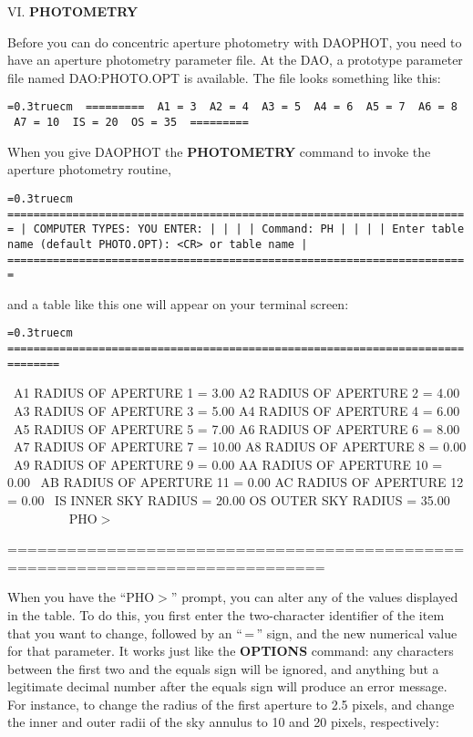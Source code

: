 \vfill
\eject
\noindent VI.  {\bf PHOTOMETRY}

Before you can do concentric aperture photometry with DAOPHOT, you
need to have an aperture photometry parameter file.  At the DAO, a
prototype parameter file named DAO:PHOTO.OPT is available.  The
file looks something like this:

\bigskip
{\obeylines\obeyspaces\frenchspacing\tt\baselineskip=0.3truecm
\     =========
\      A1 = 3
\      A2 = 4
\      A3 = 5
\      A4 = 6
\      A5 = 7
\      A6 = 8
\      A7 = 10
\      IS = 20
\      OS = 35
\     =========
}
\bigskip

\noindent When you give DAOPHOT the {\bf PHOTOMETRY} command to invoke the
aperture photometry routine,

\bigskip
{\noindent\obeylines\obeyspaces\frenchspacing\tt\baselineskip=0.3truecm
=======================================================================
| COMPUTER TYPES:                                  YOU ENTER:         |
|                                                                     |
| Command:                                         PH                 |
|                                                                     |
|       Enter table name (default PHOTO.OPT):      <CR> or table name |
=======================================================================
}
\bigskip

\noindent and a table like this one will appear on your terminal screen:

\bigskip
{\noindent\obeylines\obeyspaces\frenchspacing\tt\baselineskip=0.3truecm
==============================================================================

\ A1  RADIUS OF APERTURE  1 =     3.00    A2  RADIUS OF APERTURE  2 =     4.00
\ A3  RADIUS OF APERTURE  3 =     5.00    A4  RADIUS OF APERTURE  4 =     6.00
\ A5  RADIUS OF APERTURE  5 =     7.00    A6  RADIUS OF APERTURE  6 =     8.00
\ A7  RADIUS OF APERTURE  7 =    10.00    A8  RADIUS OF APERTURE  8 =     0.00
\ A9  RADIUS OF APERTURE  9 =     0.00    AA  RADIUS OF APERTURE 10 =     0.00
\ AB  RADIUS OF APERTURE 11 =     0.00    AC  RADIUS OF APERTURE 12 =     0.00
\ IS       INNER SKY RADIUS =    20.00    OS       OUTER SKY RADIUS =    35.00
~~~~~~~~
\ PHO$>$

==============================================================================
}
\bigskip

When you have the ``PHO$>$'' prompt, you can alter any of the values
displayed in the table.  To do this, you first enter the two-character
identifier of the item that you want to change, followed by an
``$\,$=$\,$'' sign, and the new numerical value for that parameter.  It
works just like the {\bf OPTIONS} command:  any characters between the
first two and the equals sign will be ignored, and anything but a
legitimate decimal number after the equals sign will produce an error
message.  For instance, to change the radius of the first aperture to
2.5 pixels, and change the inner and outer radii of the sky annulus to
10 and 20 pixels, respectively:

